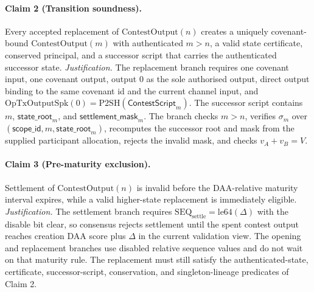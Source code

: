 \documentclass[10pt,a4paper]{article}
\begin{document}
\paragraph{Claim 2 (Transition soundness).} Every accepted replacement of $\mathrm{ContestOutput}(n)$ creates a uniquely covenant-bound $\mathrm{ContestOutput}(m)$ with authenticated $m>n$, a valid state certificate, conserved principal, and a successor script that carries the authenticated successor state. \emph{Justification.} The replacement branch requires one covenant input, one covenant output, output 0 as the sole authorised output, direct output binding to the same covenant id and the current channel input, and $\mathrm{OpTxOutputSpk}(0)=\mathrm{P2SH}(\mathsf{ContestScript}_m)$. The successor script contains $m$, $\mathsf{state\_root}_m$, and $\mathsf{settlement\_mask}_m$. The branch checks $m>n$, verifies $\sigma_m$ over $(\mathsf{scope\_id},m,\mathsf{state\_root}_m)$, recomputes the successor root and mask from the supplied participant allocation, rejects the invalid mask, and checks $v_A+v_B=V$.

\paragraph{Claim 3 (Pre-maturity exclusion).} Settlement of $\mathrm{ContestOutput}(n)$ is invalid before the DAA-relative maturity interval expires, while a valid higher-state replacement is immediately eligible. \emph{Justification.} The settlement branch requires $\mathrm{SEQ}_{\mathrm{settle}}=\mathrm{le64}(\Delta)$ with the disable bit clear, so consensus rejects settlement until the spent contest output reaches creation DAA score plus $\Delta$ in the current validation view. The opening and replacement branches use disabled relative sequence values and do not wait on that maturity rule. The replacement must still satisfy the authenticated-state, certificate, successor-script, conservation, and singleton-lineage predicates of Claim 2.
\end{document}
